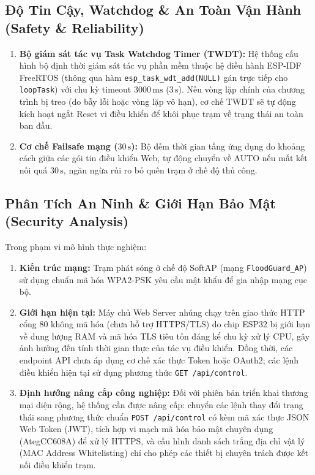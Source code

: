 \subsection{Độ Tin Cậy, Watchdog \& An Toàn Vận Hành (Safety \& Reliability)}
\begin{enumerate}
    \item \textbf{Bộ giám sát tác vụ Task Watchdog Timer (TWDT):} Hệ thống cấu hình bộ định thời giám sát tác vụ phần mềm thuộc hệ điều hành ESP-IDF FreeRTOS (thông qua hàm \lstinline|esp_task_wdt_add(NULL)| gán trực tiếp cho \texttt{loopTask}) với chu kỳ timeout $3000\,\text{ms}$ ($3\,\text{s}$). Nếu vòng lặp chính của chương trình bị treo (do bẫy lỗi hoặc vòng lặp vô hạn), cơ chế TWDT sẽ tự động kích hoạt ngắt Reset vi điều khiển để khôi phục trạm về trạng thái an toàn ban đầu.
    \item \textbf{Cơ chế Failsafe mạng ($30\,\text{s}$):} Bộ đếm thời gian tầng ứng dụng đo khoảng cách giữa các gói tin điều khiển Web, tự động chuyển về AUTO nếu mất kết nối quá $30\,\text{s}$, ngăn ngừa rủi ro bỏ quên trạm ở chế độ thủ công.
\end{enumerate}

\subsection{Phân Tích An Ninh \& Giới Hạn Bảo Mật (Security Analysis)}
Trong phạm vi mô hình thực nghiệm:
\begin{enumerate}
    \item \textbf{Kiến trúc mạng:} Trạm phát sóng ở chế độ SoftAP (mạng \texttt{FloodGuard\_AP}) sử dụng chuẩn mã hóa WPA2-PSK yêu cầu mật khẩu để gia nhập mạng cục bộ.
    \item \textbf{Giới hạn hiện tại:} Máy chủ Web Server nhúng chạy trên giao thức HTTP cổng 80 không mã hóa (chưa hỗ trợ HTTPS/TLS) do chip ESP32 bị giới hạn về dung lượng RAM và mã hóa TLS tiêu tốn đáng kể chu kỳ xử lý CPU, gây ảnh hưởng đến tính thời gian thực của tác vụ điều khiển. Đồng thời, các endpoint API chưa áp dụng cơ chế xác thực Token hoặc OAuth2; các lệnh điều khiển hiện tại sử dụng phương thức \texttt{GET /api/control}.
    \item \textbf{Định hướng nâng cấp công nghiệp:} Đối với phiên bản triển khai thương mại diện rộng, hệ thống cần được nâng cấp: chuyển các lệnh thay đổi trạng thái sang phương thức chuẩn \texttt{POST /api/control} có kèm mã xác thực JSON Web Token (JWT), tích hợp vi mạch mã hóa bảo mật chuyên dụng (AtegCC608A) để xử lý HTTPS, và cấu hình danh sách trắng địa chỉ vật lý (MAC Address Whitelisting) chỉ cho phép các thiết bị chuyên trách được kết nối điều khiển trạm.
\end{enumerate}

